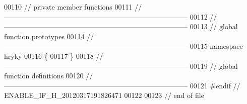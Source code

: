 \begin{DoxyCode}
00110 \textcolor{comment}{// private member functions}
00111 \textcolor{comment}{//
      ------------------------------------------------------------------------------}
00112 \textcolor{comment}{//
      ------------------------------------------------------------------------------}
00113 \textcolor{comment}{// global function prototypes}
00114 \textcolor{comment}{//
      ------------------------------------------------------------------------------}
00115 \textcolor{keyword}{namespace }hryky
00116 \{
00117 \}
00118 \textcolor{comment}{//
      ------------------------------------------------------------------------------}
00119 \textcolor{comment}{// global function definitions}
00120 \textcolor{comment}{//
      ------------------------------------------------------------------------------}
00121 \textcolor{preprocessor}{#endif // ENABLE\_IF\_H\_20120317191826471}
00122 \textcolor{preprocessor}{}
00123 \textcolor{comment}{// end of file}
\end{DoxyCode}
